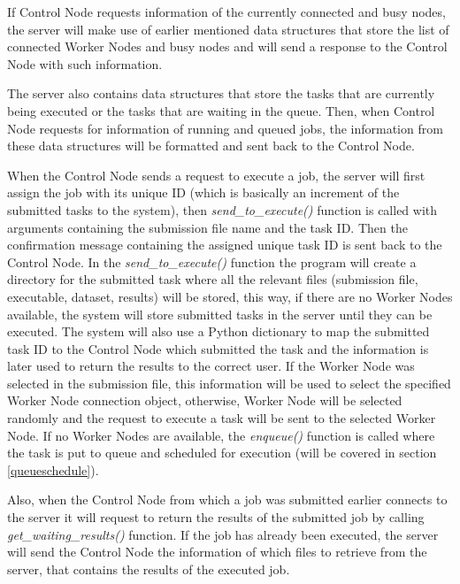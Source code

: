 \documentclass[10pt]{report}
\begin{document}
If Control Node requests information of the currently connected and busy nodes, the server will make use of earlier mentioned data structures that store the list of connected Worker Nodes and busy nodes and will send a response to the Control Node with such information.
\newline

The server also contains data structures that store the tasks that are currently being executed or the tasks that are waiting in the queue. Then, when Control Node requests for information of running and queued jobs, the information from these data structures will be formatted and sent back to the Control Node.
\newline

When the Control Node sends a request to execute a job, the server will first assign the job with its unique ID (which is basically an increment of the submitted tasks to the system), then \textit{send\_to\_execute()} function is called with arguments containing the submission file name and the task ID. Then the confirmation message containing the assigned unique task ID is sent back to the Control Node. In the \textit{send\_to\_execute()} function the program will create a directory for the submitted task where all the relevant files (submission file, executable, dataset, results) will be stored, this way, if there are no Worker Nodes available, the system will store submitted tasks in the server until they can be executed. The system will also use a Python dictionary to map the submitted task ID to the Control Node which submitted the task and the information is later used to return the results to the correct user. If the Worker Node was selected in the submission file, this information will be used to select the specified Worker Node connection object, otherwise, Worker Node will be selected randomly and the request to execute a task will be sent to the selected Worker Node. If no Worker Nodes are available, the \textit{enqueue()} function is called where the task is put to queue and scheduled for execution (will be covered in section \ref{queueschedule}).
\newline

Also, when the Control Node from which a job was submitted earlier connects to the server it will request to return the results of the submitted job by calling \textit{get\_waiting\_results()} function. If the job has already been executed, the server will send the Control Node the information of which files to retrieve from the server, that contains the results of the executed job.
\end{document}
